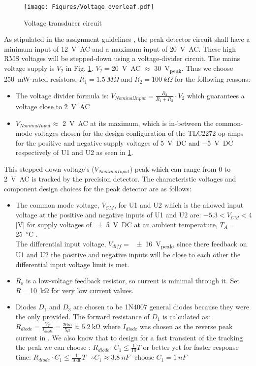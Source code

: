 \begin{figure}[H]
    \centering
    \texttt{[image: Figures/Voltage\_overleaf.pdf]}
    \caption{Voltage transducer circuit}
    \label{fig:voltage_system}
\end{figure}


As stipulated in the assignment guidelines \cite{assignment_2}, the peak detector circuit shall have a minimum input of  \SI{12}{\volt AC} and a maximum input of \SI{20}{\volt AC}. These high RMS voltages will be stepped-down using a voltage-divider circuit. The mains voltage supply is $V_2$ in Fig. \ref{fig:voltage_system}. $V_2=$\SI{20}{\volt AC} $\approx$ \SI{30}{\volt_{peak}}. Thus we choose \SI{250}{\milli\watt}-rated resistors, $R_1=1.5\ M\Omega$ and $R_2=100 \ k\Omega$ for the following reasons:

\begin{itemize}
    \item The voltage divider formula is: $V_{Nominal Input}=\frac{R_2}{R_1+R_2}\cdot V_{2}$ which guarantees a voltage close to \SI{2}{\volt AC}
    \item $V_{Nominal Input}\approx$ \SI{2}{\volt AC} at its maximum, which is in-between the common-mode voltages chosen for the design configuration of the TLC2272 \cite{TLC2272} op-amps for the positive and negative supply voltages of \SI{+5}{\volt DC} and \SI{-5}{\volt DC} respectively of U1 and U2 as seen in \ref{fig:voltage_system}.
\end{itemize}

This stepped-down voltage's ($V_{Nominal Input}$) peak which can range from 0 to \SI{2}{\volt AC} is tracked by the precision detector. The characteristic voltages and component design choices for the peak detector are as follows:
\begin{itemize}
  \item The common mode voltage, $V_{CM}$, for U1 and U2 which is the allowed input voltage at the positive and negative inputs of U1 and U2 are: $-5.3<V_{CM}<4$ [V] for supply voltages of \SI{+-5}{\volt DC}
  at an ambient temperature, $T_A=$\SI{25}{\degreeCelsius} \cite{TLC2272}.\\The differential input voltage, $V_{diff}=$ \SI{+-16}{V_{peak}}, since there feedback on U1 and U2 the positive and negative inputs will be close to each other the differential input voltage limit is met.
  \item $R_5$ is a low-voltage feedback resistor, so current is minimal through it. Set $R=$\SI{10}{\kilo\ohm} for very low current values.
  \item Diodes $D_1$ and $D_3$ are chosen to be 1N4007 general diodes because they were the only provided. The forward resistance of $D_1$ is calculated as: $R_{diode}=\frac{V_T}{I_{diode}}=\frac{26m}{5\mu}\approx\SI{5.2}{\kilo\ohm}$
  where $I_{diode}$ was chosen as the reverse peak current in
  \cite{1N4007}. We also know that to design for a fast transient of the tracking the peak we can choose \cite{voltage_peak_detector}: $R_{diode}\cdot C_1 \leq \frac{1}{10}T$ or better yet for faster response time: $R_{diode}\cdot C_1 \leq \frac{1}{1000}T \ \ \ \therefore C_1\approx3.8 \ nF \ \ \ \text{choose } C_1=1\ nF$
\end{itemize}


